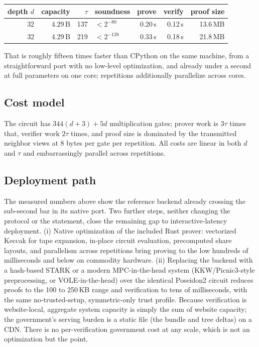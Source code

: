 \documentclass[11pt]{article}
\theoremstyle{definition}
\begin{document}
\begin{center}
\begin{tabular}{rrrlrrr}
\toprule
depth $d$ & capacity & $\tau$ & soundness & prove & verify & proof size \\
\midrule
32 & 4.29\,B  & 137 & $< 2^{-80}$  & 0.20\,s & 0.12\,s & 13.6\,MB \\
32 & 4.29\,B  & 219 & $< 2^{-128}$ & 0.33\,s & 0.18\,s & 21.8\,MB \\
\bottomrule
\end{tabular}
\end{center}

That is roughly fifteen times faster than CPython on the same machine, from a
straightforward port with no low-level optimization, and already under a second at full
parameters on one core; repetitions additionally parallelize across cores.

\subsection{Cost model}

The circuit has $344(d+3) + 5d$ multiplication gates; prover work is $3\tau$ times that,
verifier work $2\tau$ times, and proof size is dominated by the transmitted neighbor views
at 8 bytes per gate per repetition. All costs are linear in both $d$ and $\tau$ and
embarrassingly parallel across repetitions.

\subsection{Deployment path}
\label{sec:deploypath}

The measured numbers above show the reference backend already crossing the sub-second bar
in its native port. Two further steps, neither changing the protocol or the statement,
close the remaining gap to interactive-latency deployment. (i) Native optimization of the
included Rust prover: vectorized Keccak for tape expansion, in-place circuit evaluation,
precomputed share layouts, and parallelism across repetitions bring proving to the low
hundreds of milliseconds and below on commodity hardware. (ii) Replacing the backend
with a hash-based STARK or a modern MPC-in-the-head system (KKW/Picnic3-style
preprocessing, or VOLE-in-the-head) over the identical Poseidon2 circuit reduces proofs to
the 100 to 250\,KB range and verification to tens of milliseconds, with the same
no-trusted-setup, symmetric-only trust profile. Because verification is website-local,
aggregate system capacity is simply the sum of website capacity; the government's serving
burden is a static file (the bundle and tree deltas) on a CDN. There is no
per-verification government cost at any scale, which is not an optimization but the point.
\end{document}
